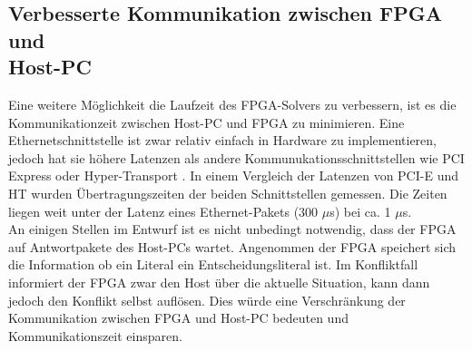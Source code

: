 \subsection{Verbesserte Kommunikation zwischen FPGA und \\Host-PC}
\label{kommu}
Eine weitere Möglichkeit die Laufzeit des FPGA-Solvers zu
verbessern, ist es die Kommunikationzeit zwischen
Host-PC und FPGA zu minimieren. Eine Ethernetschnittstelle
ist zwar relativ einfach in Hardware zu implementieren,
jedoch hat sie höhere Latenzen als andere Kommunukationsschnittstellen wie
PCI Express \cite{pcie:2006} oder Hyper-Transport \cite{ht:2006}.
In einem Vergleich \cite{htvspcie:2006} der Latenzen von PCI-E und HT
wurden Übertragungszeiten der beiden Schnittstellen gemessen.
Die Zeiten liegen weit unter der Latenz eines Ethernet-Pakets (300 $\mu$s)
bei ca. 1 $\mu$s.\\
An einigen Stellen im Entwurf ist es nicht unbedingt notwendig,
dass der FPGA auf Antwortpakete des Host-PCs wartet. Angenommen
der FPGA speichert sich die Information ob ein Literal ein Entscheidungsliteral
ist. Im Konfliktfall informiert der FPGA zwar den Host
über die aktuelle Situation, kann dann jedoch den Konflikt
selbst auflösen. Dies würde eine Verschränkung der Kommunikation
zwischen FPGA und Host-PC bedeuten und Kommunikationszeit
einsparen.


